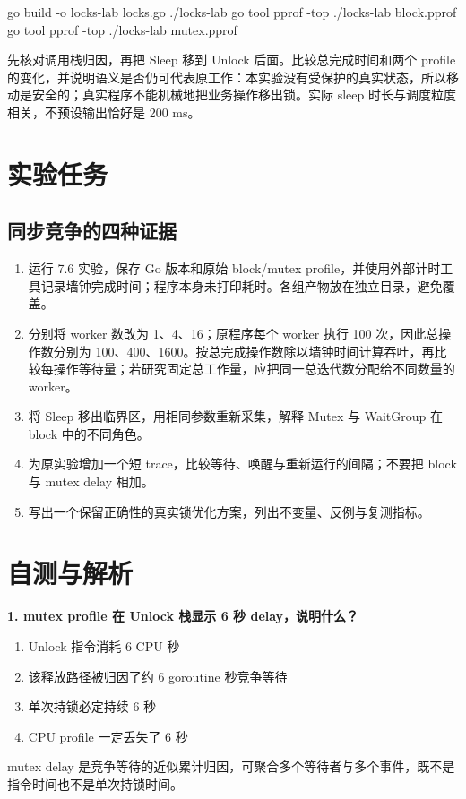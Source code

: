 \documentclass[UTF8,fontset=fandol,openany,11pt]{ctexbook}
\begin{document}
\begin{codeblock}
go build -o locks-lab locks.go
./locks-lab
go tool pprof -top ./locks-lab block.pprof
go tool pprof -top ./locks-lab mutex.pprof
\end{codeblock}

先核对调用栈归因，再把 Sleep 移到 Unlock 后面。比较总完成时间和两个 profile 的变化，并说明语义是否仍可代表原工作：本实验没有受保护的真实状态，所以移动是安全的；真实程序不能机械地把业务操作移出锁。实际 sleep 时长与调度粒度相关，不预设输出恰好是 200 ms。

\section{实验任务}
\subsection*{同步竞争的四种证据}
\begin{enumerate}
\item 运行 7.6 实验，保存 Go 版本和原始 block/mutex profile，并使用外部计时工具记录墙钟完成时间；程序本身未打印耗时。各组产物放在独立目录，避免覆盖。

\item 分别将 worker 数改为 1、4、16；原程序每个 worker 执行 100 次，因此总操作数分别为 100、400、1600。按总完成操作数除以墙钟时间计算吞吐，再比较每操作等待量；若研究固定总工作量，应把同一总迭代数分配给不同数量的 worker。

\item 将 Sleep 移出临界区，用相同参数重新采集，解释 Mutex 与 WaitGroup 在 block 中的不同角色。

\item 为原实验增加一个短 trace，比较等待、唤醒与重新运行的间隔；不要把 block 与 mutex delay 相加。

\item 写出一个保留正确性的真实锁优化方案，列出不变量、反例与复测指标。

\end{enumerate}
\section{自测与解析}
\noindent\textbf{1. mutex profile 在 Unlock 栈显示 6 秒 delay，说明什么？}
\begin{enumerate}[label=\Alph*.]
\item Unlock 指令消耗 6 CPU 秒
\item 该释放路径被归因了约 6 goroutine 秒竞争等待
\item 单次持锁必定持续 6 秒
\item CPU profile 一定丢失了 6 秒
\end{enumerate}
mutex delay 是竞争等待的近似累计归因，可聚合多个等待者与多个事件，既不是指令时间也不是单次持锁时间。
\end{document}
